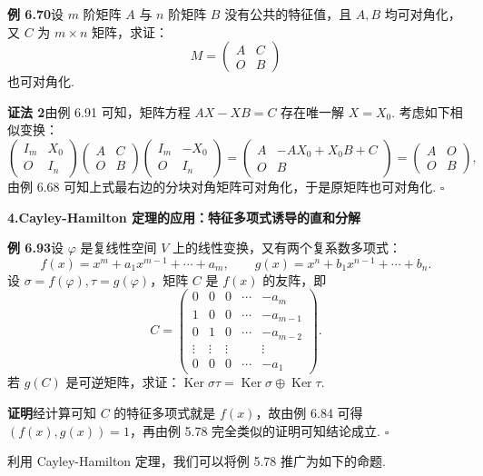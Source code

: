 \documentclass[UTF8,12pt,a4paper,fontset=fandol]{ctexart}
\begin{document}
\noindent\textbf{例 6.70}\quad 设 $m$ 阶矩阵 $A$ 与 $n$ 阶矩阵 $B$ 没有公共的特征值，且 $A,B$ 均可对角化，又 $C$ 为 $m\times n$ 矩阵，求证：
\[
M=\begin{pmatrix} A&C\\ O&B\end{pmatrix}
\]
也可对角化.

\noindent\textbf{证法 2}\quad 由例 6.91 可知，矩阵方程 $AX-XB=C$ 存在唯一解 $X=X_0$. 考虑如下相似变换：
\[
\begin{pmatrix} I_m&X_0\\ O&I_n\end{pmatrix}
\begin{pmatrix} A&C\\ O&B\end{pmatrix}
\begin{pmatrix} I_m&-X_0\\ O&I_n\end{pmatrix}
=
\begin{pmatrix} A&-AX_0+X_0B+C\\ O&B\end{pmatrix}
=
\begin{pmatrix} A&O\\ O&B\end{pmatrix},
\]
由例 6.68 可知上式最右边的分块对角矩阵可对角化，于是原矩阵也可对角化. $\square$

\noindent\textbf{4.\quad Cayley-Hamilton 定理的应用：特征多项式诱导的直和分解}

\noindent\textbf{例 6.93}\quad 设 $\varphi$ 是复线性空间 $V$ 上的线性变换，又有两个复系数多项式：
\[
f(x)=x^m+a_1x^{m-1}+\cdots+a_m,\qquad
g(x)=x^n+b_1x^{n-1}+\cdots+b_n.
\]
设 $\sigma=f(\varphi),\tau=g(\varphi)$，矩阵 $C$ 是 $f(x)$ 的友阵，即
\[
C=
\begin{pmatrix}
0&0&0&\cdots&-a_m\\
1&0&0&\cdots&-a_{m-1}\\
0&1&0&\cdots&-a_{m-2}\\
\vdots&\vdots&\vdots&&\vdots\\
0&0&0&\cdots&-a_1
\end{pmatrix}.
\]
若 $g(C)$ 是可逆矩阵，求证：$\operatorname{Ker}\sigma\tau=\operatorname{Ker}\sigma\oplus\operatorname{Ker}\tau$.

\noindent\textbf{证明}\quad 经计算可知 $C$ 的特征多项式就是 $f(x)$，故由例 6.84 可得 $(f(x),g(x))=1$，再由例 5.78 完全类似的证明可知结论成立. $\square$

利用 Cayley-Hamilton 定理，我们可以将例 5.78 推广为如下的命题.
\end{document}
